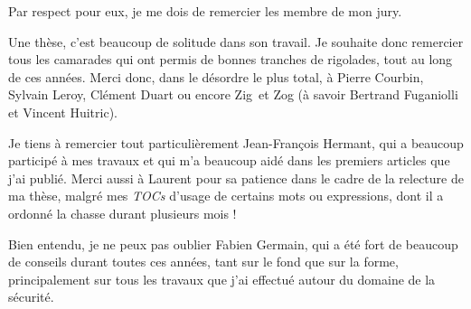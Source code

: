 \par
Par respect pour eux, je me dois de remercier les membre de mon jury.

\par
Une thèse, c'est beaucoup de solitude dans son travail. Je souhaite donc
remercier tous les camarades qui ont permis de bonnes tranches de rigolades,
tout au long de ces années. Merci donc, dans le désordre le plus total, à {\sc
Pierre Courbin}, {\sc Sylvain Leroy}, {\sc Clément Duart} ou encore {\sc Zig} et {\sc
Zog} (à savoir Bertrand Fuganiolli et Vincent Huitric).

\par
Je tiens à remercier tout particulièrement {\sc Jean-François Hermant}, qui a
beaucoup participé à mes travaux et qui m'a beaucoup aidé dans les premiers
articles que j'ai publié. Merci aussi à Laurent pour sa patience dans le cadre
de la relecture de ma thèse, malgré mes {\it TOCs} d'usage de certains mots ou
expressions, dont il a ordonné la chasse durant plusieurs mois ! 

\par
Bien entendu, je ne peux pas oublier {\sc Fabien Germain}, qui a été fort de
beaucoup de conseils durant toutes ces années, tant sur le fond que sur la
forme, principalement sur tous les travaux que j'ai effectué autour du domaine
de la sécurité.
